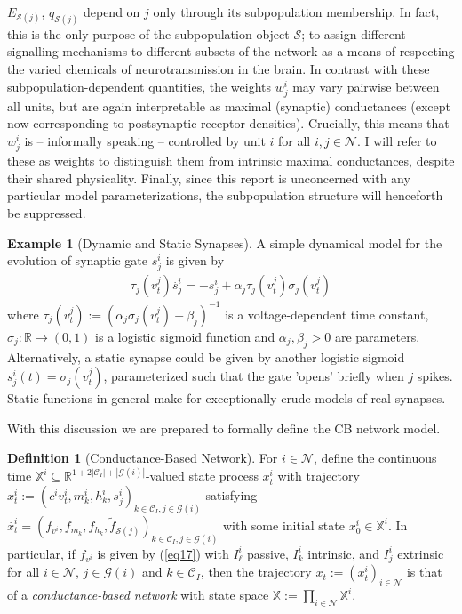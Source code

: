 \documentclass[12pt, oneside]{report}
\newcommand{\mbb}[1]{\mathbb{#1}}
\newcommand{\1}[1]{\mathbbm{1}_{\{#1\}}}
\newcommand{\mc}[1]{\mathcal{#1}}
\newcommand*{\td}[1]{\overset{\bm .}{#1}}
\theoremstyle{definition}
\newtheorem{definition}[theorem]{Definition}
\newtheorem{example}[theorem]{Example}
\begin{document}
$E_{\mc{S}(j)}$, $q_{\mc{S}(j)}$ depend on $j$ only through its subpopulation
membership. In fact, this is the only purpose of the subpopulation object
$\mc{S}$; to assign different signalling mechanisms to different subsets of the
network as a means of respecting the varied chemicals of neurotransmission in
the brain. In contrast with these subpopulation-dependent quantities, the
weights $w^i_j$ may vary pairwise between all units, but are again interpretable
as maximal (synaptic) conductances (except now corresponding to postsynaptic
receptor densities). Crucially, this means that $w^i_j$ is -- informally
speaking -- controlled by unit $i$ for all $i,j\in\mc{N}$. I will refer to these
as weights to distinguish them from intrinsic maximal conductances, despite
their shared physicality. Finally, since this report is unconcerned with any
particular model parameterizations, the subpopulation structure will henceforth
be suppressed.
\begin{example}[Dynamic and Static Synapses]
    A simple dynamical model \cite[$\S$ 8.1]{Ermentrout_Terman_2010} for the evolution of
    synaptic gate $s^i_j$ is given by
    \begin{align}
        \tau_{j}(v^j_t)\td{s}^i_j=-s^i_j+\alpha_{j}\tau_{j}(v^j_t)\sigma_{j}(v^j_t)\label{eq27}
    \end{align}
    where
    $\tau_{j}(v^j_t):=(\alpha_{j}\sigma_{j}(v^j_t)+\beta_{j})^{-1}$
    is a voltage-dependent time constant,
    $\sigma_{j}:\mbb{R}\rightarrow(0,1)$ is a logistic sigmoid function
    and $\alpha_{j},\beta_{j}>0$ are parameters. Alternatively, a static synapse
    could be given by another logistic sigmoid
    $s^i_j(t)=\sigma_{j}(v^j_t)$, parameterized such that the gate
    'opens' briefly when $j$ spikes. Static functions in general make for
    exceptionally crude models of real synapses.
\end{example}
With this discussion we are prepared to formally define the CB network model.
\begin{definition}[Conductance-Based Network]\label{def12} For $i\in\mc{N}$, define
    the continuous time
    $\mbb{X}^i\subseteq\mbb{R}^{1+2|\mc{C}_I|+|\mc{G}(i)|}$-valued state process
    $x^i_t$ with trajectory
    $x^i_t:=(c^iv^i_t,m^i_k,h^i_k,s^i_j)_{k\in\mc{C}_I,j\in\mc{G}(i)}$
    satisfying
    $\td{x}^i_t=(f_{v^i},f_{m_k},f_{h_k},\widetilde{f}_{\mc{S}(j)})_{k\in\mc{C}_I,j\in\mc{G}(i)}$
    with some initial state $x^i_0\in\mbb{X}^i$. In particular, if $f_{v^i}$ is
    given by (\ref{eq17}) with $I^i_\ell$ passive, $I^i_k$ intrinsic, and
    $I^i_j$ extrinsic for all $i\in\mc{N}$, $j\in\mc{G}(i)$ and $k\in\mc{C}_I$,
    then the trajectory $x_t:=(x^i_t)_{i\in\mc{N}}$ is that of a {\it
    conductance-based network} with state space
    $\mbb{X}:=\prod_{i\in\mc{N}}\mbb{X}^i$. 
\end{definition}
\end{document}
